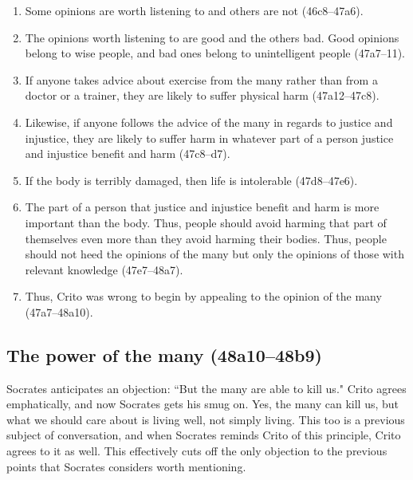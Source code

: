 \documentclass[12pt,letterpaper]{article}
\begin{document}
\begin{enumerate}

    \item Some opinions are worth listening to and others are not (46c8--47a6).

    \item The opinions worth listening to are good and the others bad. Good opinions belong to wise people, and bad ones belong to unintelligent people (47a7--11).

    \item If anyone takes advice about exercise from the many rather than from a doctor or a trainer, they are likely to suffer physical harm (47a12--47c8).

    \item Likewise, if anyone follows the advice of the many in regards to justice and injustice, they are likely to suffer harm in whatever part of a person justice and injustice benefit and harm (47c8--d7).

    \item If the body is terribly damaged, then life is intolerable (47d8--47e6).

    \item The part of a person that justice and injustice benefit and harm is more important than the body. Thus, people should avoid harming that part of themselves even more than they avoid harming their bodies. Thus, people should not heed the opinions of the many but only the opinions of those with relevant knowledge (47e7--48a7).

    \item Thus, Crito was wrong to begin by appealing to the opinion of the many (47a7--48a10).

\end{enumerate}


\subsection*{The power of the many (48a10--48b9)}

Socrates anticipates an objection: ``But the many are able to kill us."
Crito agrees emphatically, and now Socrates gets his smug on. Yes, the many
can kill us, but what we should care about is living well, not simply
living. This too is a previous subject of conversation, and when Socrates
reminds Crito of this principle, Crito agrees to it as well. This
effectively cuts off the only objection to the previous points that
Socrates considers worth mentioning.
\end{document}
